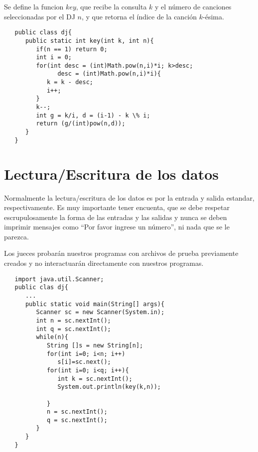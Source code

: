 \documentclass[a4paper,12pt]{article}
\begin{document}
Se define la funcion $key$, que recibe la consulta $k$ y el número de canciones seleccionadas por el DJ $n$, y que retorna el índice de la canción $k$-ésima.

\begin{lstlisting}
   public class dj{
      public static int key(int k, int n){
         if(n == 1) return 0;
         int i = 0;
         for(int desc = (int)Math.pow(n,i)*i; k>desc;
               desc = (int)Math.pow(n,i)*i){
            k = k - desc;
            i++;
         }
         k--;
         int g = k/i, d = (i-1) - k \% i;
         return (g/(int)pow(n,d));
      }
   }
\end{lstlisting}

\section{Lectura/Escritura de los datos}

Normalmente la lectura/escritura de los datos es por la entrada y salida estandar, respectivamente. Es muy importante tener encuenta, que se debe respetar escrupulosamente la forma de las entradas y las salidas y nunca se deben imprimir mensajes como ``Por favor ingrese un número'', ni nada que se le parezca.

Los jueces probarán nuestros programas con archivos de prueba previamente creados y no interactuarán directamente con nuestros programas.

\begin{lstlisting}
   import java.util.Scanner;
   public clas dj{
      ...
      public static void main(String[] args){
         Scanner sc = new Scanner(System.in);
         int n = sc.nextInt();
         int q = sc.nextInt();
         while(n){
            String []s = new String[n];
            for(int i=0; i<n; i++) 
               s[i]=sc.next();
            for(int i=0; i<q; i++){
               int k = sc.nextInt();
               System.out.println(key(k,n));

            }
            n = sc.nextInt();
            q = sc.nextInt();
         }
      }    
   }
\end{lstlisting}
\end{document}
